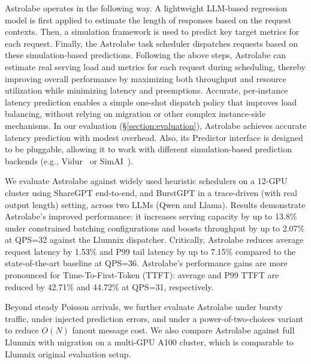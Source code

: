 \documentclass[sigconf, review, anonymous]{acmart}
\newcommand{\EK}[1]{}
\begin{document}

Astrolabe operates in the following way. A lightweight LLM-based regression model is first applied to estimate the length of responses based on the request contexts. Then, a simulation framework is used to predict key target metrics for each request. Finally, the Astrolabe task scheduler dispatches requests based on these simulation-based predictions. Following the above steps, Astrolabe can estimate real serving load and metrics for each request during scheduling, thereby improving overall performance by maximizing both throughput and resource utilization while minimizing latency and preemptions.
Accurate, per-instance latency prediction enables a simple one-shot dispatch policy that improves load balancing, without relying on migration or other complex instance-side mechanisms. In our evaluation (\S\ref{section:evaluation}), Astrolabe achieves accurate latency prediction with modest overhead. Also, its Predictor interface is designed to be pluggable, allowing it to work with different simulation-based prediction backends (e.g., Vidur~\cite{vidur} or SimAI~\cite{simAI}).

We evaluate Astrolabe against widely used heuristic schedulers on a 12-GPU cluster using ShareGPT end-to-end, and BurstGPT in a trace-driven (with real output length) setting, across two LLMs (Qwen and Llama). Results demonstrate Astrolabe's improved performance: it increases serving capacity by up to 13.8\% under constrained batching configurations and boosts throughput by up to 2.07\% at QPS=32 against the Llumnix dispatcher. Critically, Astrolabe reduces average request latency by 1.53\% and P99 tail latency by up to 7.15\% compared to the state-of-the-art baseline at QPS=36. Astrolabe's performance gains are more pronounced for Time-To-First-Token (TTFT): average and P99 TTFT are reduced by 42.71\% and 44.72\% at QPS=31, respectively.

Beyond steady Poisson arrivals, we further evaluate Astrolabe under bursty traffic, under injected prediction errors, and under a power-of-two-choices variant to reduce $O(N)$ fanout message cost. We also compare Astrolabe against full Llumnix with migration on a multi-GPU A100 cluster, which is comparable to Llumnix original evaluation setup.
\end{document}
